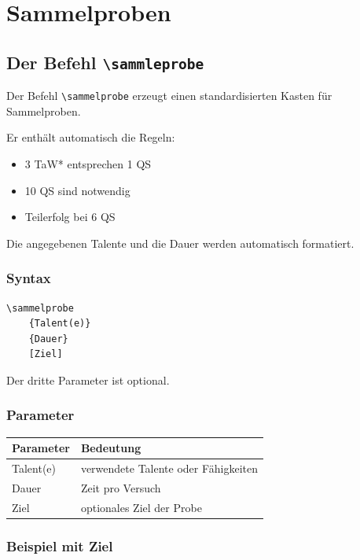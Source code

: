 \section{Sammelproben}

\subsection{Der Befehl \texttt{\textbackslash sammleprobe}}

Der Befehl \verb|\sammelprobe| erzeugt einen standardisierten Kasten für Sammelproben.

Er enthält automatisch die Regeln:

\begin{itemize}
\item 3 TaW* entsprechen 1 QS
\item 10 QS sind notwendig
\item Teilerfolg bei 6 QS
\end{itemize}

Die angegebenen Talente und die Dauer werden automatisch formatiert.

\subsubsection*{Syntax}

\begin{Verbatim}
\sammelprobe
    {Talent(e)}
    {Dauer}
    [Ziel]
\end{Verbatim}

Der dritte Parameter ist optional.

\subsubsection*{Parameter}

\begin{center}
\begin{tabular}{|l|l|}
\hline
Parameter & Bedeutung\\
\hline
Talent(e) & verwendete Talente oder Fähigkeiten\\
\hline
Dauer & Zeit pro Versuch\\
\hline
Ziel & optionales Ziel der Probe\\
\hline
\end{tabular}
\end{center}

\subsubsection*{Beispiel mit Ziel}

